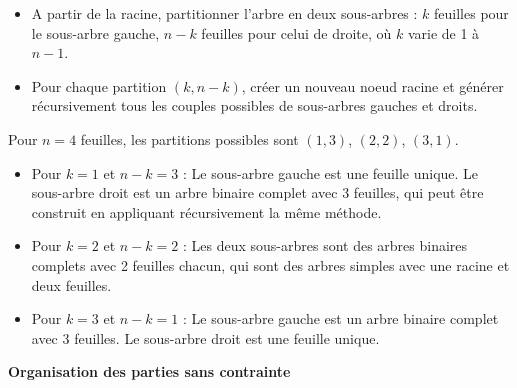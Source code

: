 \documentclass[10pt,a4paper]{article}
\begin{document}
\begin{itemize}
     \item A partir de la racine, partitionner l'arbre en deux sous-arbres : \( k \) feuilles pour
     le sous-arbre gauche, \( n - k \) feuilles pour celui de droite, où \( k \) varie de 1 à
     \( n - 1 \).
     \item Pour chaque partition \( (k, n - k) \), créer un nouveau noeud racine et générer
     récursivement tous les couples possibles de sous-arbres gauches et droits.
\end{itemize}

Pour \( n = 4 \) feuilles, les partitions possibles sont  \( (1, 3) \), \( (2, 2) \), \( (3, 1) \).
\begin{itemize}
     \item Pour \( k = 1 \) et \( n - k = 3 \) : Le sous-arbre gauche est une feuille unique. Le
  sous-arbre droit est un arbre binaire complet avec 3 feuilles, qui peut être construit en
  appliquant récursivement la même méthode.
  \item  Pour \( k = 2 \) et \( n - k = 2 \) : Les deux
  sous-arbres sont des arbres binaires complets avec 2 feuilles chacun, qui sont des arbres simples
  avec une racine et deux feuilles.
  \item Pour \( k = 3 \) et \( n - k = 1 \) : Le sous-arbre gauche
  est un arbre binaire complet avec 3 feuilles. Le sous-arbre droit est une feuille unique.
\end{itemize}



\q \textbf{Organisation des parties sans contrainte}
\end{document}
